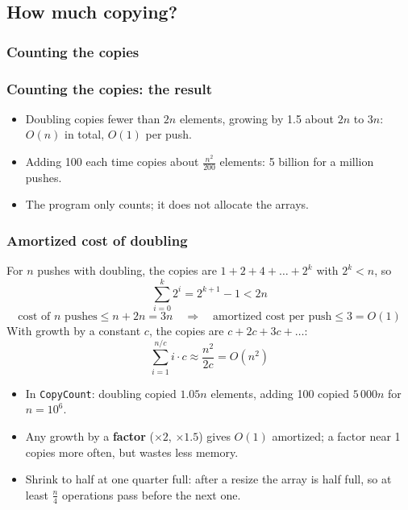 \documentclass[aspectratio=169,10pt,compress]{beamer}
\begin{document}
\subsection[Copies]{How much copying?}




\begin{frame}[t,fragile] \frametitle{Counting the copies}
\end{frame}




\begin{frame}[t,fragile] \frametitle{Counting the copies: the result}
  \begin{itemize}\small
    \item Doubling copies fewer than $2n$ elements, growing by 1.5 about $2n$ to $3n$: $O(n)$ in total, $O(1)$ per push.
    \item Adding 100 each time copies about $\frac{n^{2}}{200}$ elements: 5 billion for a million pushes.
    \item The program only counts; it does not allocate the arrays.
  \end{itemize}
\end{frame}




\begin{frame}[t,fragile] \frametitle{Amortized cost of doubling}
  For $n$ pushes with doubling, the copies are $1 + 2 + 4 + \dots + 2^{k}$ with $2^{k} < n$, so
  \[
  	\sum_{i=0}^{k} 2^{i} = 2^{k+1} - 1 < 2n
  \]
  \[
  	\text{cost of } n \text{ pushes} \le n + 2n = 3n \quad\Rightarrow\quad \text{amortized cost per push} \le 3 = O(1)
  \]
  With growth by a constant $c$, the copies are $c + 2c + 3c + \dots$:
  \[
  	\sum_{i=1}^{n/c} i \cdot c \approx \frac{n^{2}}{2c} = O(n^{2})
  \]
  \begin{itemize}\small
    \item In \texttt{CopyCount}: doubling copied $1.05n$ elements, adding 100 copied $5\,000n$ for $n = 10^{6}$.
    \item Any growth by a \textbf{factor} ($\times 2$, $\times 1.5$) gives $O(1)$ amortized; a factor near 1 copies more often, but wastes less memory.
    \item Shrink to half at one quarter full: after a resize the array is half full, so at least $\frac{n}{4}$ operations pass before the next one.
  \end{itemize}
\end{frame}
\end{document}
